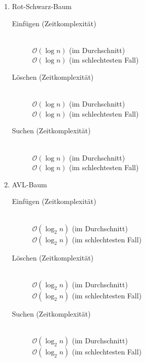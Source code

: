 \documentclass{bschlangaul-aufgabe}
\begin{document}
\begin{enumerate}


\item Rot-Schwarz-Baum

\begin{bAntwort}
\begin{description}
\item[Einfügen (Zeitkomplexität)] \strut \\
$\mathcal{O}(\log n)$ (im Durchschnitt) \\
$\mathcal{O}(\log n)$ (im schlechtesten Fall)

\item[Löschen (Zeitkomplexität)] \strut \\
$\mathcal{O}(\log n)$ (im Durchschnitt) \\
$\mathcal{O}(\log n)$ (im schlechtesten Fall)

\item[Suchen (Zeitkomplexität)] \strut \\
$\mathcal{O}(\log n)$ (im Durchschnitt) \\
$\mathcal{O}(\log n)$ (im schlechtesten Fall)
\end{description}
\end{bAntwort}


\item AVL-Baum

\begin{bAntwort}
\begin{description}
\item[Einfügen (Zeitkomplexität)] \strut \\
$\mathcal{O}(\log_2 n)$ (im Durchschnitt) \\
$\mathcal{O}(\log_2 n)$ (im schlechtesten Fall)

\item[Löschen (Zeitkomplexität)] \strut \\
$\mathcal{O}(\log_2 n)$ (im Durchschnitt) \\
$\mathcal{O}(\log_2 n)$ (im schlechtesten Fall)

\item[Suchen (Zeitkomplexität)] \strut \\
$\mathcal{O}(\log_2 n)$ (im Durchschnitt) \\
$\mathcal{O}(\log_2 n)$ (im schlechtesten Fall)
\end{description}
\end{bAntwort}


\end{enumerate}
\end{document}
